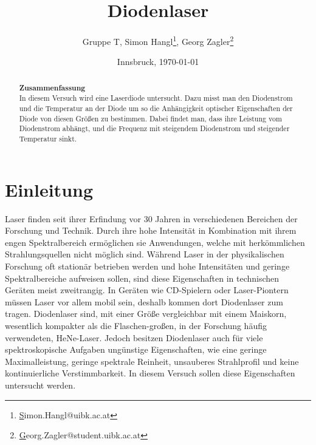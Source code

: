 \documentclass[a4paper,10pt]{scrartcl} %
\title{Diodenlaser}
\author{Gruppe T, Simon Hangl\footnote{\href{mailto:simon.hangl@uibk.ac.at}Simon.Hangl@uibk.ac.at}, Georg Zagler\footnote{\href{mailto:georg.zagler@student.uibk.ac.at}Georg.Zagler@student.uibk.ac.at}}
\date{Innsbruck, \today}
\begin{document}
\maketitle
\tableofcontents

\begin{abstract}
\textbf{Zusammenfassung}\\
In diesem Versuch wird eine Laserdiode untersucht. Dazu misst man den Diodenstrom und die Temperatur an der Diode um so die Anhängigkeit optischer Eigenschaften der Diode von diesen Grö\ss en zu bestimmen. Dabei findet man, dass ihre Leistung vom Diodenstrom abhängt, und die Frequenz mit steigendem Diodenstrom und steigender Temperatur sinkt.
\end{abstract}

\section{Einleitung}
\label{sec:Einleitung}
Laser finden seit ihrer Erfindung vor 30 Jahren in verschiedenen Bereichen der Forschung und Technik. Durch ihre hohe Intensität in Kombination mit ihrem engen Spektralbereich ermöglichen sie Anwendungen, welche mit herkömmlichen Strahlungsquellen nicht möglich sind. Während Laser in der physikalischen Forschung oft stationär betrieben werden und hohe Intensitäten und geringe Spektralbereiche aufweisen sollen, sind diese Eigenschaften in technischen Geräten meist zweitrangig. In Geräten wie CD-Spielern oder Laser-Piontern müssen Laser vor allem mobil sein, deshalb kommen dort Diodenlaser zum tragen. Diodenlaser sind, mit einer Grö\ss e vergleichbar mit einem Maiskorn, wesentlich kompakter als die Flaschen-gro\ss en, in der Forschung häufig verwendeten, HeNe-Laser. Jedoch besitzen Diodenlaser auch für viele spektroskopische Aufgaben ungünstige Eigenschaften, wie eine geringe Maximalleistung, geringe spektrale Reinheit, unsauberes Strahlprofil und keine kontinuierliche Verstimmbarkeit. In diesem Versuch sollen diese Eigenschaften untersucht werden.
\end{document}
